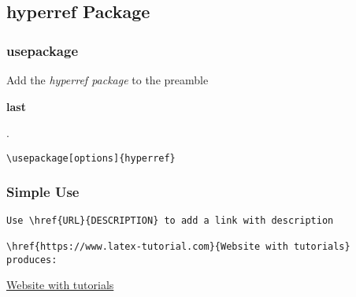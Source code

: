 \documentclass[class=article, crop=false, titlepage, twoside, multi={itemize, figure, verbatim}, float=false]{standalone}
\title{}  %
\begin{document}

\ifstandalone
\maketitle %
\clearpage
\tableofcontents %
\clearpage
\fi

\subsection[hyperref Package]{\LARGE hyperref Package}

\subsubsection[usepackage]{\Large usepackage}

Add the \textit{hyperref package} to the preamble\begin{large}\textbf{ last}\end{large}.	

\begin{verbatim}\usepackage[options]{hyperref}\end{verbatim}

\subsubsection[Simple Use]{\Large Simple Use}
\begin{verbatim}Use \href{URL}{DESCRIPTION} to add a link with description

\href{https://www.latex-tutorial.com}{Website with tutorials}
produces:
\end{verbatim}
\href{https://www.latex-tutorial.com}{Website with tutorials}
\end{document}
